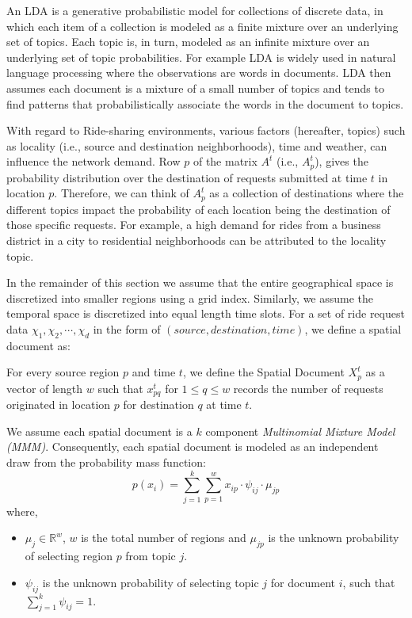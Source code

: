 An LDA is a generative probabilistic model for collections of discrete data, in which each item of a collection is modeled as a finite mixture over an underlying set of topics. Each topic is, in turn, modeled as an infinite mixture over an underlying set of topic probabilities\cite{Blei03}. For example LDA is widely used in natural language processing where the observations are words in documents. LDA then assumes each document is a mixture of a small number of topics and tends to find patterns that probabilistically associate the words in the document to topics.

With regard to Ride-sharing environments, various factors (hereafter, topics) such as locality (i.e., source and destination neighborhoods), time and weather, can influence the network demand. Row $p$ of the matrix $A^t$ (i.e., $A_p^t$), gives the probability distribution over the destination of requests submitted at time $t$ in location $p$. Therefore, we can think of $A_p^t$ as a collection of destinations where the different topics impact the probability of each location being the destination of those specific requests. For example, a high demand for rides from a business district in a city to residential neighborhoods can be attributed to the locality topic.

In the remainder of this section we assume that the entire geographical space is discretized into smaller regions using a grid index. Similarly, we assume the temporal space is discretized into equal length time slots. For a set of ride request data $\chi_1, \chi_2, \cdots, \chi_d$ in the form of $(source, destination, time)$, we define a spatial document as:

\begin{definition}
For every source region $p$ and time $t$, we define the Spatial Document $X_p^t$ as a vector of length $w$ such that $x_{pq}^t$ for $1 \leq q \leq w$ records the number of requests originated in location $p$ for destination $q$ at time $t$.
\end{definition}

We assume each spatial document is a $k$ component \emph{Multinomial Mixture Model (MMM)}. Consequently, each spatial document is modeled as an independent draw from the probability mass function:
\begin{equation}
\label{eq:multpmf}
p(x_i) = \sum_{j=1}^k \sum_{p=1}^w x_{ip}\cdot\psi_{ij}\cdot\mu_{jp}
\end{equation}
where,
\begin{itemize}
\item $\mu_j \in \mathbb{R}^w$, $w$ is the total number of regions and $\mu_{jp}$ is the unknown probability of selecting region $p$ from topic $j$.
\item $\psi_{ij}$ is the unknown probability of selecting topic $j$ for document $i$, such that $\sum_{j=1}^k \psi_{ij} = 1$.
\end{itemize}

